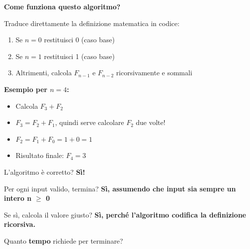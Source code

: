 \documentclass[a4paper, 11pt]{article}
\theoremstyle{definition}
\theoremstyle{remark}
\theoremstyle{remark}
\begin{document}
	\begin{softnote}
		\textbf{Come funziona questo algoritmo?}
		
		Traduce direttamente la definizione matematica in codice:
		\begin{enumerate}
			\item Se $n=0$ restituisci 0 (caso base)
			\item Se $n=1$ restituisci 1 (caso base)
			\item Altrimenti, calcola $F_{n-1}$ e $F_{n-2}$ ricorsivamente e sommali
		\end{enumerate}
		
		\textbf{Esempio per $n=4$:}
		\begin{itemize}
			\item Calcola $F_3 + F_2$
			\item $F_3 = F_2 + F_1$, quindi serve calcolare $F_2$ due volte!
			\item $F_2 = F_1 + F_0 = 1 + 0 = 1$
			\item Risultato finale: $F_4 = 3$
		\end{itemize}
	\end{softnote}
	
	L'algoritmo è corretto? \textbf{Sì!}
	
	Per ogni input valido, termina? \textbf{Sì, assumendo che input sia sempre un intero n  $\geq$ 0}
	
	Se sì, calcola il valore giusto? \textbf{Sì, perché l'algoritmo codifica la definizione ricorsiva.}
	
	Quanto \textbf{tempo} richiede per terminare?
	
\end{document}
